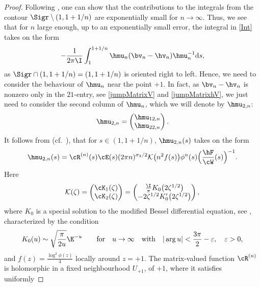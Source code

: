 \begin{proof}
 Following \cite[Proposition~C.3]{CD}, one can show that the contributions to the integrals from the contour $\Sigr \setminus (1,1+1/n)$ are exponentially small for $n \to \infty$. Thus, we see that for $n$ large enough, up to an exponentially small error, the integral in \eqref{Int} takes on the form
\begin{align}\label{localizedIntegral}
 - \frac{1}{2\pi \I}\int_1^{1+1/n} \hmu_n(\bv_n-\hv_n)\hmu_n^{-1} {\rm d}s,
\end{align}
as $\Sigr \cap (1,1+1/n)= (1,1+1/n)$ is oriented right to left. Hence, we need to consider the behaviour of $\hmu_n$ near the point $+1$. In fact, as $\bv_n-\hv_n$ is nonzero only in the $21$-entry, see \eqref{jumpMatrixV} and \eqref{jumpMatrixhV}, we just need to consider the second column of $\hmu_n$, which we will denote by $\hmu_{2,n}$:
\begin{align*}
 \hmu_{2,n} = \begin{pmatrix}
 \hmu_{12,n}
 \\
 \hmu_{22,n}
 \end{pmatrix}.
\end{align*}
It follows from \cite[Section~6, 7]{KMVV} (cf.\ \cite[equation~B.12]{CD}), that for $s \in (1, 1+1/n)$, $\hmu_{2,n}(s)$ takes on the form
\begin{align}\label{explicithmu}
 \hmu_{2,n}(s) = \cR^{(n)}(s)
 \cE(s)(2\pi n)^{\sigma_3/2} \mathcal K\big(n^2 f(s)\big)\phi^n(s)\Big(\frac{\hF}{\cW}(s)\Big)^{-1}.
\end{align}
Here
\begin{align*}
 \mathcal K(\zeta) = \begin{pmatrix}
 \cK_1(\zeta)
 \\
 \cK_2(\zeta)
 \end{pmatrix} = \begin{pmatrix}
 \frac{\I}{\pi}K_0\big(2\zeta^{1/2}\big)
 \\
 -2\zeta^{1/2} K_0'\big(2\zeta^{1/2}\big)
 \end{pmatrix},
\end{align*}
where $K_0$ is a special solution to the modified Bessel differential equation, see \cite[Section~10.25]{DLMF}, characterized by the condition
\begin{align*}
 K_0(u) \sim \sqrt{\frac{\pi}{2u}}\E^{-u} \qquad \text{for} \quad u \to \infty \quad \text{with} \quad |\arg u | < \frac{3\pi}{2} - \varepsilon, \quad \varepsilon > 0,
\end{align*}
and $f(z) = \frac{\log^2 \phi(z)}{4}$ locally around $z = +1$. The matrix-valued function $\cR^{(n)}$ is holomorphic in a fixed neighbourhood $U_{+1}$, of $+1$, where it satisfies uniformly

\end{proof}
